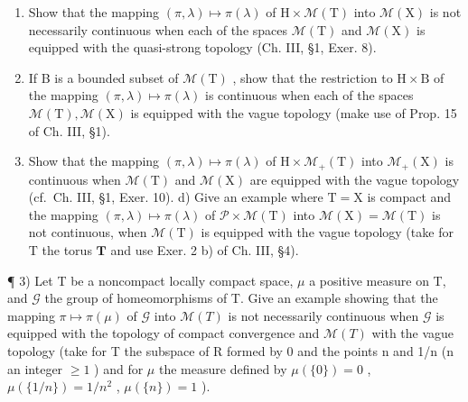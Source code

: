 \begin{enumerate}
\def\labelenumi{\alph{enumi})}
\item
  Show that the mapping \((\pi, \lambda) \mapsto \pi(\lambda)\) of \(\mathrm{H} \times \mathcal{M}(\mathrm{T})\) into \(\mathcal{M}(\mathrm{X})\) is not necessarily continuous when each of the spaces \(\mathcal{M}(\mathrm{T})\) and \(\mathcal{M}(\mathrm{X})\) is equipped with the quasi-strong topology (Ch. III, §1, Exer. 8).
\item
  If B is a bounded subset of \(\mathcal{M}(\mathrm{T})\) , show that the restriction to \(\mathrm{H} \times \mathrm{B}\) of the mapping \((\pi, \lambda) \mapsto \pi(\lambda)\) is continuous when each of the spaces \(\mathcal{M}(\mathrm{T}), \mathcal{M}(\mathrm{X})\) is equipped with the vague topology (make use of Prop. 15 of Ch. III, §1).
\item
  Show that the mapping \((\pi, \lambda) \mapsto \pi(\lambda)\) of \(\mathrm{H} \times \mathcal{M}_{+}(\mathrm{T})\) into \(\mathcal{M}_{+}(\mathrm{X})\) is continuous when \(\mathcal{M}(\mathrm{T})\) and \(\mathcal{M}(\mathrm{X})\) are equipped with the vague topology (cf.~Ch. III, §1, Exer. 10). d) Give an example where \(\mathrm{T} = \mathrm{X}\) is compact and the mapping \((\pi, \lambda) \mapsto \pi(\lambda)\) of \(\mathcal{P} \times \mathcal{M}(\mathrm{T})\) into \(\mathcal{M}(\mathrm{X}) = \mathcal{M}(\mathrm{T})\) is not continuous, when \(\mathcal{M}(\mathrm{T})\) is equipped with the vague topology (take for \(\mathrm{T}\) the torus \(\mathbf{T}\) and use Exer. 2 b) of Ch. III, §4).
\end{enumerate}

¶ 3) Let T be a noncompact locally compact space, \(\mu\) a positive measure on T, and \(\mathcal{G}\) the group of homeomorphisms of T. Give an example showing that the mapping \(\pi \mapsto \pi(\mu)\) of \(\mathcal{G}\) into \(\mathcal{M}(T)\) is not necessarily continuous when \(\mathcal{G}\) is equipped with the topology of compact convergence and \(\mathcal{M}(T)\) with the vague topology (take for T the subspace of R formed by 0 and the points n and 1/n (n an integer \(\geqslant 1\) ) and for \(\mu\) the measure defined by \(\mu(\{0\}) = 0\) , \(\mu(\{1/n\}) = 1/n^2\) , \(\mu(\{n\}) = 1\) ).

